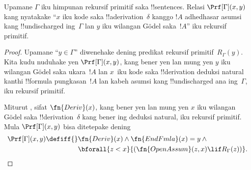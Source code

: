 \documentclass[../../../include/open-logic-section]{subfiles}
\begin{document}
\begin{prop}
  Upamane $\Gamma$ iku himpunan rekursif primitif saka
  !!{sentence}s. Relasi $\Prf[\Gamma](x, y)$ kang nyatakake
  ``$x$ iku kode saka !!a{derivation}~$\delta$ kanggo $!A$
  adhedhasar asumsi kang !!{undischarged} ing~$\Gamma$ lan
  $y$ iku wilangan G\"odel saka~$!A$'' iku rekursif primitif.
\end{prop}

\begin{proof}
  Upamane ``$y \in \Gamma$'' diwenehake dening predikat
  rekursif primitif~$R_\Gamma(y)$. Kita kudu nuduhake yen
  $\Prf[\Gamma](x, y)$, kang bener yen lan mung yen $y$ iku
  wilangan G\"odel saka ukara~$!A$ lan $x$~iku kode saka
  !!{derivation} deduksi natural kanthi !!{formula}
  pungkasan~$!A$ lan kabeh asumsi kang !!{undischarged}
  ana ing~$\Gamma$, iku rekursif primitif.

  Miturut , sifat $\fn{Deriv}(x)$, kang bener
  yen lan mung yen $x$ iku wilangan G\"odel saka
  !!{derivation}~$\delta$ kang bener ing deduksi natural,
  iku rekursif primitif. Mula $\Prf[\Gamma](x, y)$ bisa
  ditetepake dening
  \begin{align*}
    \Prf[\Gamma](x, y) \defiff {}
    & \fn{Deriv}(x) \land \fn{EndFmla}(x) = y \land {} \\
    & \bforall{z < x}{(\fn{OpenAssum}(z, x) \lif R_\Gamma(z))}.
  \end{align*}
\end{proof}
\end{document}
